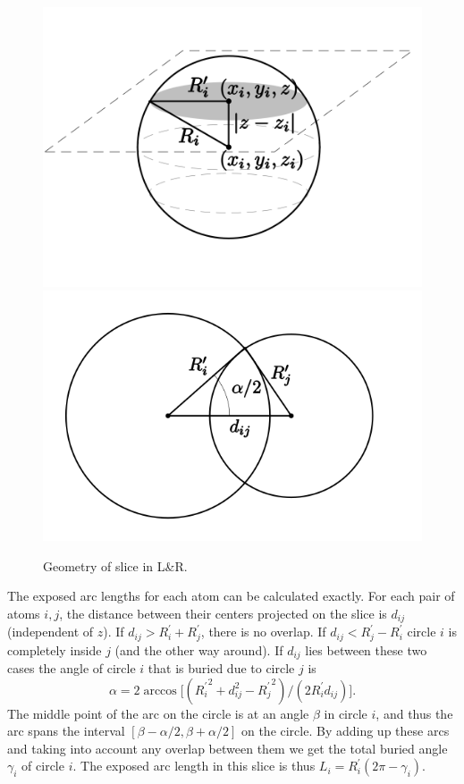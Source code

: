 \documentclass[a4paper,11pt]{article}
\begin{document}
\begin{small}
\begin{figure}
\includegraphics{fig/lnr_slice}
\includegraphics{fig/lnr_circles}
\caption{Geometry of slice in L\&R.\label{fig:slice}}
\end{figure}

The exposed arc lengths for each atom can be calculated exactly. For
each pair of atoms $i,j$, the distance between their centers projected
on the slice is $d_{ij}$ (independent of $z$). If $d_{ij} > R_i^\prime
+ R_j^\prime$, there is no overlap. If $d_{ij} < R_j^\prime -
R_i^\prime$ circle $i$ is completely inside $j$ (and the other way
around). If $d_{ij}$ lies between these two cases the angle of circle
$i$ that is buried due to circle $j$ is $$\alpha = 2\arccos
\bigl[({R_i^\prime}^2 + d_{ij}^2 - {R_{j}^\prime}^2)/(2R_i^\prime
  d_{ij})\bigr].$$ The middle point of the arc on the circle is at an
angle $\beta$ in circle $i$, and thus the arc spans the interval
$[\beta-\alpha/2,\beta+\alpha/2]$ on the circle. By adding up these
arcs and taking into account any overlap between them we get the total
buried angle $\gamma_i$ of circle $i$. The exposed arc length in this
slice is thus $L_i = R_i^\prime(2\pi-\gamma_i)$.


\end{small}
\end{document}
